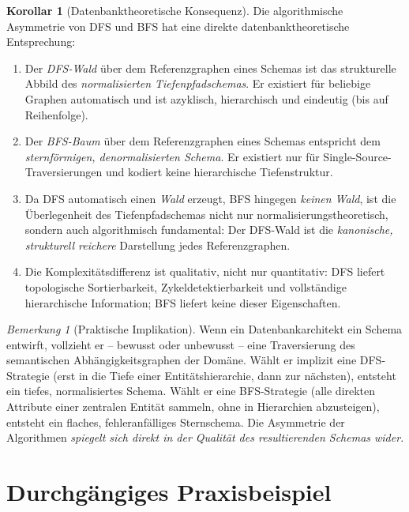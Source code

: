 ﻿\documentclass[a4paper,12pt]{report}
\theoremstyle{definition}
\newtheorem{corollary}[theorem]{Korollar}
\theoremstyle{remark}
\newtheorem{remark}{Bemerkung}[chapter]
\begin{document}
\begin{corollary}[Datenbanktheoretische Konsequenz]
\label{cor:konsequenz_asymmetrie}
Die algorithmische Asymmetrie von DFS und BFS hat eine direkte
datenbanktheoretische Entsprechung:

\begin{enumerate}[label=(\roman*)]
  \item Der \emph{DFS-Wald} über dem Referenzgraphen eines Schemas ist
        das strukturelle Abbild des \emph{normalisierten Tiefenpfadschemas}.
        Er existiert für beliebige Graphen automatisch und ist azyklisch,
        hierarchisch und eindeutig (bis auf Reihenfolge).
  \item Der \emph{BFS-Baum} über dem Referenzgraphen eines Schemas entspricht
        dem \emph{sternförmigen, denormalisierten Schema}. Er existiert nur
        für Single-Source-Traversierungen und kodiert keine hierarchische
        Tiefenstruktur.
  \item Da DFS automatisch einen \emph{Wald} erzeugt, BFS hingegen
        \emph{keinen Wald}, ist die Überlegenheit des Tiefenpfadschemas
        nicht nur normalisierungstheoretisch, sondern auch algorithmisch
        fundamental: Der DFS-Wald ist die \emph{kanonische, strukturell
        reichere} Darstellung jedes Referenzgraphen.
  \item Die Komplexitätsdifferenz ist qualitativ, nicht nur quantitativ:
        DFS liefert topologische Sortierbarkeit, Zykeldetektierbarkeit
        und vollständige hierarchische Information; BFS liefert keine
        dieser Eigenschaften.
\end{enumerate}
\end{corollary}

\begin{remark}[Praktische Implikation]
Wenn ein Datenbankarchitekt ein Schema entwirft, vollzieht er -- bewusst
oder unbewusst -- eine Traversierung des semantischen Abhängigkeitsgraphen
der Domäne. Wählt er implizit eine DFS-Strategie (erst in die Tiefe einer
Entitätshierarchie, dann zur nächsten), entsteht ein tiefes, normalisiertes
Schema. Wählt er eine BFS-Strategie (alle direkten Attribute einer zentralen
Entität sammeln, ohne in Hierarchien abzusteigen), entsteht ein flaches,
fehleranfälliges Sternschema. Die Asymmetrie der Algorithmen \emph{spiegelt
sich direkt in der Qualität des resultierenden Schemas wider}.
\end{remark}

\section{Durchgängiges Praxisbeispiel}
\label{sec:beispiel}
\end{document}
